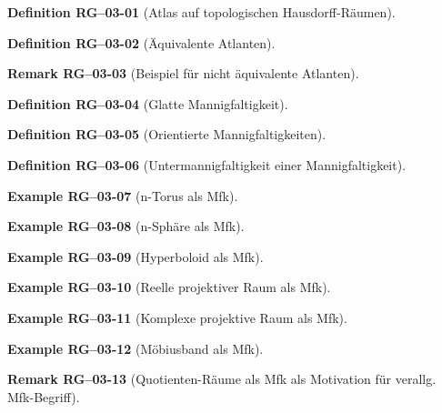 \documentclass[10pt, letterpaper]{article}
\newcommand{\CustomHeading}[3]{%
  \par\medskip\noindent%
  \textbf{#1 #2} \textnormal{(#3)}.\enskip%
}
\newenvironment{DEF}[2]{\CustomHeading{Definition}{#1}{#2}}{}
\newenvironment{REM}[2]{\CustomHeading{Remark}{#1}{#2}}{}
\newenvironment{EXA}[2]{\CustomHeading{Example}{#1}{#2}}{}
\begin{document}
\begin{DEF}{RG--03-01}{Atlas auf topologischen Hausdorff-Räumen}
\end{DEF}

\begin{DEF}{RG--03-02}{Äquivalente Atlanten}
\end{DEF}

\begin{REM}{RG--03-03}{Beispiel für nicht äquivalente Atlanten}
\end{REM}

\begin{DEF}{RG--03-04}{Glatte Mannigfaltigkeit}
\end{DEF}

\begin{DEF}{RG--03-05}{Orientierte Mannigfaltigkeiten}
\end{DEF}

\begin{DEF}{RG--03-06}{Untermannigfaltigkeit einer Mannigfaltigkeit}
\end{DEF}

\begin{EXA}{RG--03-07}{n-Torus als Mfk}
\end{EXA}

\begin{EXA}{RG--03-08}{n-Sphäre als Mfk}
\end{EXA}

\begin{EXA}{RG--03-09}{Hyperboloid als Mfk}
\end{EXA}

\begin{EXA}{RG--03-10}{Reelle projektiver Raum als Mfk}
\end{EXA}

\begin{EXA}{RG--03-11}{Komplexe projektive Raum als Mfk}
\end{EXA}

\begin{EXA}{RG--03-12}{Möbiusband als Mfk}
\end{EXA}

\begin{REM}{RG--03-13}{Quotienten-Räume als Mfk als Motivation für verallg. Mfk-Begriff}
\end{REM}
\end{document}
